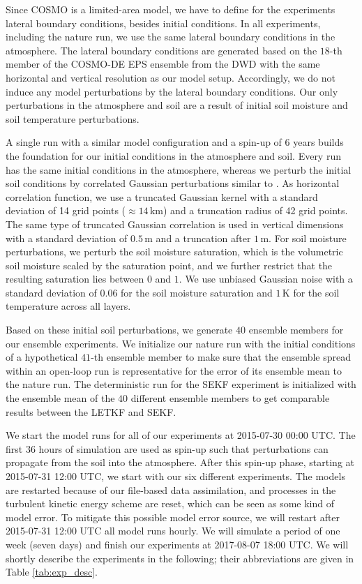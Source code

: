 \documentclass[HESSD, manuscript]{copernicus}
\begin{document}
Since COSMO is a limited-area model, we have to define for the experiments lateral boundary conditions, besides initial conditions.
In all experiments, including the nature run, we use the same lateral boundary conditions in the atmosphere.
The lateral boundary conditions are generated based on the $18$-th member of the COSMO-DE EPS ensemble from the DWD with the same horizontal and vertical resolution as our model setup.
Accordingly, we do not induce any model perturbations by the lateral boundary conditions.
Our only perturbations in the atmosphere and soil are a result of initial soil moisture and soil temperature perturbations.

A single run with a similar model configuration and a spin-up of $6$ years builds the foundation for our initial conditions in the atmosphere and soil.
Every run has the same initial conditions in the atmosphere, whereas we perturb the initial soil conditions by correlated Gaussian perturbations similar to \cite{schraff_kilometre-scale_2016}.
As horizontal correlation function, we use a truncated Gaussian kernel with a standard deviation of 14 grid points ($\approx 14 \,\text{km}$) and a truncation radius of 42 grid points.
The same type of truncated Gaussian correlation is used in vertical dimensions with a standard deviation of $0.5\,\text{m}$ and a truncation after $1\,\text{m}$.
For soil moisture perturbations, we perturb the soil moisture saturation, which is the volumetric soil moisture scaled by the saturation point, and we further restrict that the resulting saturation lies between $0$ and $1$.
We use unbiased Gaussian noise with a standard deviation of $0.06$ for the soil moisture saturation and $1\,\text{K}$ for the soil temperature across all layers.

Based on these initial soil perturbations, we generate $40$ ensemble members for our ensemble experiments.
We initialize our nature run with the initial conditions of a hypothetical $41$-th ensemble member to make sure that the ensemble spread within an open-loop run is representative for the error of its ensemble mean to the nature run.
The deterministic run for the SEKF experiment is initialized with the ensemble mean of the $40$ different ensemble members to get comparable results between the LETKF and SEKF.

We start the model runs for all of our experiments at 2015-07-30 00:00 UTC.
The first $36$ hours of simulation are used as spin-up such that perturbations can propagate from the soil into the atmosphere.
After this spin-up phase, starting at 2015-07-31 12:00 UTC, we start with our six different experiments.
The models are restarted because of our file-based data assimilation, and processes in the turbulent kinetic energy scheme are reset, which can be seen as some kind of model error.
To mitigate this possible model error source, we will restart after 2015-07-31 12:00 UTC all model runs hourly.
We will simulate a period of one week (seven days) and finish our experiments at 2017-08-07 18:00 UTC.
We will shortly describe the experiments in the following; their abbreviations are given in Table \ref{tab:exp_desc}.\\
\end{document}
